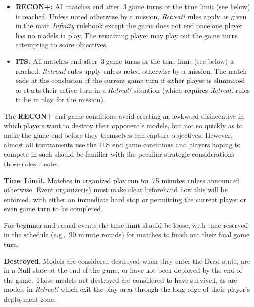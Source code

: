 \documentclass[14pt,dvipsnames]{extarticle}
\newcommand{\missionrule}[1]{\noindent\textbf{#1}\xspace}
\newcommand{\reconplus}{\textbf{RECON+}\xspace}
\begin{document}
\vspace{-1em}
\begin{itemize}
\item \textbf{RECON+:} All matches end after~3 game turns or the time
  limit (see below) is reached.  Unless noted otherwise by a mission,
  \emph{Retreat!} rules apply as given in the main \emph{Infinity}
  rulebook except the game does not end once one player has no models
  in play.  The remaining player may play out the game turns
  attempting to score objectives.

\item \textbf{ITS:} All matches end after~3 game turns or the time
  limit (see below) is reached.  \emph{Retreat!} rules apply unless
  noted otherwise by a mission.  The match ends at the conclusion of
  the current game turn if either player is eliminated or starts their
  active turn in a \emph{Retreat!} situation (which requires
  \emph{Retreat!} rules to be in play for the mission).
\end{itemize}

\vspace{-1em}
\begin{recon}
  The \reconplus end game conditions avoid creating an awkward
  disincentive in which players want to destroy their opponent's
  models, but not so quickly as to make the game end before they
  themselves can capture objectives.  However, almost all tournaments
  use the ITS end game conditions and players hoping to compete in
  such should be familiar with the peculiar strategic considerations
  those rules create.
\end{recon}


\missionrule{Time Limit.} Matches in organized play run for~75 minutes
unless announced otherwise.  Event organizer(s) must make clear
beforehand how this will be enforced, with either an immediate hard
stop or permitting the current player or even game turn to be
completed.

\begin{recon}
  For beginner and casual events the time limit should be loose, with
  time reserved in the schedule (e.g.,~90 minute rounds) for matches
  to finish out their final game turn.
\end{recon}

\missionrule{Destroyed.} Models are considered destroyed when they
enter the Dead state, are in a Null state at the end of the game, or
have not been deployed by the end of the game.  Those models not
destroyed are considered to have survived, as are models in
\emph{Retreat!} which exit the play area through the long edge of
their player's deployment zone.
\end{document}
